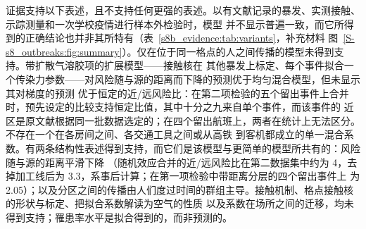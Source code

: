 证据支持以下表述，且不支持任何更强的表述。以有文献记录的暴发、实测接触、示踪测量和一次学校疫情进行样本外检验时，模型
并不显示普遍一致，而它所得到的正确结论也并非其所特有（表~\ref{s8b_evidence:tab:variants}，补充材料
图~\ref{S-s8_outbreaks:fig:summary}）。仅在位于同一格点的人之间传播的模型未得到支持。带扩散气溶胶项的扩展模型——接触核在
其他暴发上标定、每个事件拟合一个传染力参数——对风险随与源的距离而下降的预测优于均匀混合模型，但未显示其对梯度的预测
优于恒定的近/远风险比：在第二项检验的五个留出事件上合并时，预先设定的比较支持恒定比值，其中十分之九来自单个事件，而该事件的
近区是原文献根据同一批数据选定的；在四个留出航班上，两者在统计上无法区分。不存在一个在各房间之间、各交通工具之间或从高铁
到客机都成立的单一混合系数。有两条结构性表述得到支持，而它们是该模型与更简单的模型所共有的：风险随与源的距离平滑下降
（随机效应合并的近/远风险比在第二数据集中约为 4，去掉加工线后为 3.3，系事后计算；在第一项检验中带距离分层的四个留出事件上
为 2.05）；以及分区之间的传播由人们度过时间的群组主导。接触机制、格点接触核的形状与标定、把拟合系数解读为空气的性质
以及系数在场所之间的迁移，均未得到支持；罹患率水平是拟合得到的，而非预测的。

